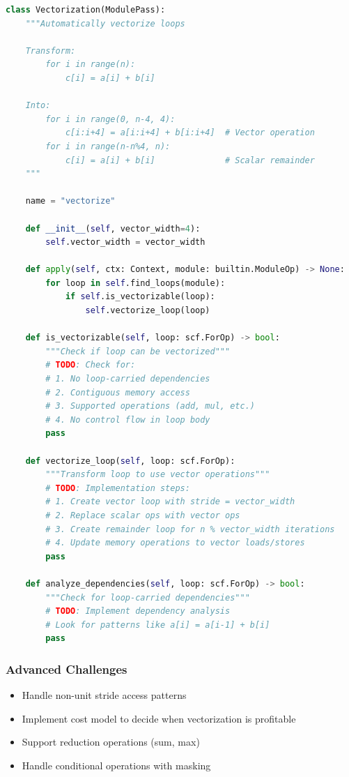 \documentclass[11pt,a4paper]{article}
\begin{document}
\begin{lstlisting}[language=Python, caption=Exercise: Auto-Vectorization]
class Vectorization(ModulePass):
    """Automatically vectorize loops

    Transform:
        for i in range(n):
            c[i] = a[i] + b[i]

    Into:
        for i in range(0, n-4, 4):
            c[i:i+4] = a[i:i+4] + b[i:i+4]  # Vector operation
        for i in range(n-n%4, n):
            c[i] = a[i] + b[i]              # Scalar remainder
    """

    name = "vectorize"

    def __init__(self, vector_width=4):
        self.vector_width = vector_width

    def apply(self, ctx: Context, module: builtin.ModuleOp) -> None:
        for loop in self.find_loops(module):
            if self.is_vectorizable(loop):
                self.vectorize_loop(loop)

    def is_vectorizable(self, loop: scf.ForOp) -> bool:
        """Check if loop can be vectorized"""
        # TODO: Check for:
        # 1. No loop-carried dependencies
        # 2. Contiguous memory access
        # 3. Supported operations (add, mul, etc.)
        # 4. No control flow in loop body
        pass

    def vectorize_loop(self, loop: scf.ForOp):
        """Transform loop to use vector operations"""
        # TODO: Implementation steps:
        # 1. Create vector loop with stride = vector_width
        # 2. Replace scalar ops with vector ops
        # 3. Create remainder loop for n % vector_width iterations
        # 4. Update memory operations to vector loads/stores
        pass

    def analyze_dependencies(self, loop: scf.ForOp) -> bool:
        """Check for loop-carried dependencies"""
        # TODO: Implement dependency analysis
        # Look for patterns like a[i] = a[i-1] + b[i]
        pass
\end{lstlisting}

\subsubsection{Advanced Challenges}
\begin{itemize}
    \item Handle non-unit stride access patterns
    \item Implement cost model to decide when vectorization is profitable
    \item Support reduction operations (sum, max)
    \item Handle conditional operations with masking
\end{itemize}
\end{document}

